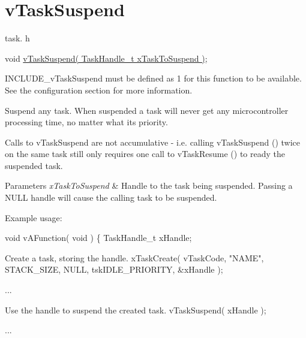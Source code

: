 \hypertarget{group__vTaskSuspend}{\section{v\-Task\-Suspend}
\label{group__vTaskSuspend}
}
task. h 
\begin{DoxyPre}void \hyperlink{task_8h_a84d4e660b04630be2939d91b3c2412f8}{vTaskSuspend( TaskHandle\_t xTaskToSuspend )};\end{DoxyPre}


I\-N\-C\-L\-U\-D\-E\-\_\-v\-Task\-Suspend must be defined as 1 for this function to be available. See the configuration section for more information.

Suspend any task. When suspended a task will never get any microcontroller processing time, no matter what its priority.

Calls to v\-Task\-Suspend are not accumulative -\/ i.\-e. calling v\-Task\-Suspend () twice on the same task still only requires one call to v\-Task\-Resume () to ready the suspended task.


\begin{DoxyParams}{Parameters}
{\em x\-Task\-To\-Suspend} & Handle to the task being suspended. Passing a N\-U\-L\-L handle will cause the calling task to be suspended.\\
\hline
\end{DoxyParams}
Example usage\-: 
\begin{DoxyPre}
 void vAFunction( void )
 \{
 TaskHandle\_t xHandle;\end{DoxyPre}



\begin{DoxyPre}Create a task, storing the handle.
     xTaskCreate( vTaskCode, "NAME", STACK\_SIZE, NULL, tskIDLE\_PRIORITY, \&xHandle );\end{DoxyPre}



\begin{DoxyPre}...\end{DoxyPre}



\begin{DoxyPre}Use the handle to suspend the created task.
     vTaskSuspend( xHandle );\end{DoxyPre}



\begin{DoxyPre}...\end{DoxyPre}




